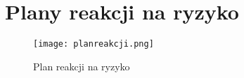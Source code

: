 
\section{Plany reakcji na ryzyko}

\begin{figure}[h]
\begin{center}
\texttt{[image: planreakcji.png]}
\caption[Plan reakcji na ryzyko]{Plan reakcji na ryzyko}
\label{rysunekProces}
\end{center}
\end{figure}


